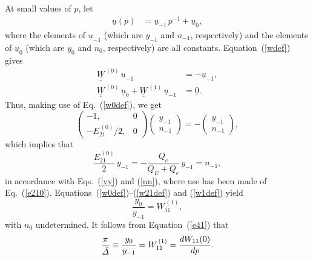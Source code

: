 \documentclass[12pt,prb,aps]{revtex4-1}
\begin{document}
At small values of $p$, let
\begin{align}
\underline{u}(p) &= \underline{u}_{-1}\,p^{-1} + \underline{u}_0,
\end{align}
where the elements of  $\underline{u}_{-1}$ (which are $y_{-1}$ and $n_{-1}$, respectively) and the elements of $\underline{u}_{0}$ (which are $y_0$ 
and $n_0$, respectively) are all constants.
Equation~(\ref{wdef}) gives 
\begin{align}
\underline{\underline{W}}^{\,(0)}\,\underline{u}_{-1} &= - \underline{u}_{-1},\\[0.5ex]
\underline{\underline{W}}^{\,(0)}\,\underline{u}_{0} + \underline{\underline{W}}^{\,(1)}\,\underline{u}_{-1} &=\underline{0}.\label{w1def}
\end{align}
Thus, making use of Eq.~(\ref{w0def}), we get
\begin{equation}
\left(\begin{array}{cc} -1,&0\\ -E_{21}^{\,(0)}/2,&0\end{array}\right) \left(\begin{array}{c}y_{-1}\\ n_{-1}\end{array}\right)= -\left(\begin{array}{c}y_{-1}\\ n_{-1}\end{array}\right),
\end{equation}
which implies that
\begin{equation}
\frac{E_{21}^{\,(0)}}{2}\,y_{-1}= - \frac{Q_e}{Q_E+Q_e}\,y_{-1} = n_{-1},
\end{equation}
in accordance with Eqs.~(\ref{yy}) and (\ref{nn}), where use has been made of Eq.~(\ref{e210}). 
Equations~(\ref{w0def})--(\ref{w21def})  and (\ref{w1def})  yield
\begin{equation}
\frac{y_0}{y_{-1}}= W_{11}^{\,(1)},
\end{equation}
with $n_0$ undetermined. 
It follows from Equation~(\ref{e41}) that 
\begin{equation}\label{e111}
\frac{\pi}{\hat{\mit\Delta}}\equiv \frac{y_0}{y_{-1}} = W_{11}^{\,(1)} = \frac{dW_{11}(0)}{dp}.
\end{equation}
\end{document}
